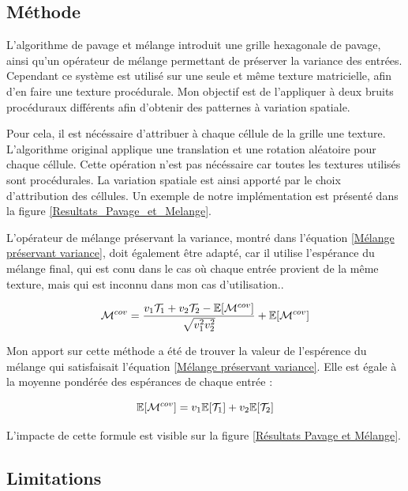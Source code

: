 \documentclass{article}
\begin{document}
\subsection{Méthode}

L'algorithme de pavage et mélange \cite{HPnoise} introduit une grille
hexagonale de pavage, ainsi qu'un opérateur de mélange permettant de préserver
la variance des entrées. Cependant ce système est utilisé sur une seule et même
texture matricielle, afin d'en faire une texture procédurale. Mon objectif est
de l'appliquer à deux bruits procéduraux différents afin d'obtenir des
patternes à variation spatiale.

Pour cela, il est nécéssaire d'attribuer à chaque céllule de la grille une
texture. L'algorithme original applique une translation et une rotation
aléatoire pour chaque céllule. Cette opération n'est pas nécéssaire car toutes
les textures utilisés sont procédurales. La variation spatiale est ainsi
apporté par le choix d'attribution des céllules. Un exemple de notre
implémentation est présenté dans la figure \ref{Resultats_Pavage_et_Melange}.

L'opérateur de mélange préservant la variance, montré dans l'équation
\ref{Mélange préservant variance}, doit également être adapté, car il utilise
l'espérance du mélange final, qui est conu dans le cas où chaque entrée
provient de la même texture, mais qui est inconnu dans mon cas d'utilisation..

\begin{equation}\centering\label{Mélange préservant variance}
    \mathcal{M}^{cov} =
    \frac{v_1\mathcal{T}_1 + v_2\mathcal{T}_2 - \mathbb{E}[\mathcal{M}^{cov}]}{\sqrt{v_1^2 v_2^2}}
    +\mathbb{E}[\mathcal{M}^{cov}]
\end{equation}

Mon apport sur cette méthode a été de trouver la valeur de l'espérence du
mélange qui satisfaisait l'équation \ref{Mélange préservant variance}. Elle est
égale à la moyenne pondérée des espérances de chaque entrée :

\begin{equation}\centering\label{Espérance mélange préservant la varance}
    \mathbb{E}[\mathcal{M}^{cov}] = v_1\mathbb{E}[\mathcal{T}_1] + v_2\mathbb{E}[\mathcal{T}_2]
\end{equation}

L'impacte de cette formule est visible sur la figure \ref{Résultats Pavage et
    Mélange}.

\subsection{Limitations}
\end{document}
